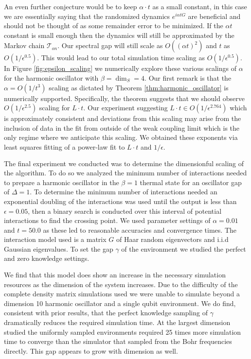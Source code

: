 \documentclass[
 amsmath,amssymb,
 aps,
onecolumn, 
nofootinbib]{revtex4-2}
\newcommand{\TT}{\mathcal{T}}
\newcommand{\bigo}[1]{O\left(#1\right)}
\begin{document}
An even further conjecture would be to keep $\alpha \cdot t$ as a small constant, in this case we are essentially saying that the randomized dynamics $e^{i \alpha t G}$ are beneficial and should not be thought of as some remainder error to be minimized. If the $\alpha t$ constant is small enough then the dynamics will still be approximated by the Markov chain $\TT_{on}$. Our spectral gap will still scale as $\bigo{(\alpha t)^2}$ and $t$ as $\bigo{1/\epsilon^{0.5}}$. This would lead to our total simulation time scaling as $\bigo{1/\epsilon^{0.5}}$. In Figure \ref{fig:epsilon_scaling} we numerically explore these various scalings of $\alpha$ for the harmonic oscillator with $\beta = \dim_S = 4$. Our first remark is that the $\alpha = \bigo{1/t^3}$ scaling as dictated by Theorem \ref{thm:harmonic_oscillator} is numerically supported. 
 Specifically, the theorem suggests that we should observe $O(1/\epsilon^{2.5})$ scaling for $L\cdot t$. 
 Our experiment suggesting $L \cdot t \in \bigo{1/\epsilon^{2.764}}$ which is approximately consistent and deviations from this scaling may arise from the inclusion of data in the fit from outside of the weak coupling limit which is the only regime where we anticipate this scaling. We obtained these exponents via least squares fitting of a power-law fit to $L\cdot t$ and $1/\epsilon$. 

The final experiment we conducted was to determine the dimensionful scaling of the algorithm. To do so we analyzed the minimum number of interactions needed to prepare a harmonic oscillator in the $\beta = 1$ thermal state for an oscillator gap of $\Delta = 1$. To determine the minimum number of interactions needed an exponential doubling of the interactions was used until the output is less than $\epsilon = 0.05$, then a binary search is conducted over this interval of potential interactions to find the crossing point. We used parameter settings of $\alpha = 0.01$ and $t = 50.0$ as these led to reasonable accuracies and convergence times. The interaction model used is a matrix $G$ of Haar random eigenvectors and i.i.d Gaussian eigenvalues. To set the gap $\gamma$ of the environment we studied the perfect and zero knowledge settings.

We find that this model does show an increase in the necessary simulation resources as the dimension of the system increases. Due to the difficulty of the complete density matrix simulations used we were unable to simulate beyond a dimension 10 harmonic oscillator and a single qubit environment. We do find, consistent with prior results, that the perfect knowledge sampling of $\gamma$ dramatically reduces the required simulation time. At the largest dimension studied the uniformly sampled environments required 25 times more simulation time to converge than the simulator that sampled from the Bohr frequencies directly. This gap appears to grow with dimension as well.
\end{document}
